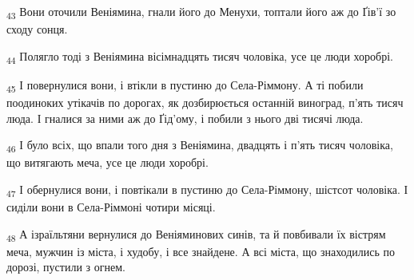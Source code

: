 \begin{tcolorbox}
\textsubscript{43} Вони оточили Веніямина, гнали його до Менухи, топтали його аж до Ґів'ї зо сходу сонця.
\end{tcolorbox}
\begin{tcolorbox}
\textsubscript{44} Полягло тоді з Веніямина вісімнадцять тисяч чоловіка, усе це люди хоробрі.
\end{tcolorbox}
\begin{tcolorbox}
\textsubscript{45} І повернулися вони, і втікли в пустиню до Села-Ріммону. А ті побили поодиноких утікачів по дорогах, як дозбирюється останній виноград, п'ять тисяч люда. І гналися за ними аж до Ґід'ому, і побили з нього дві тисячі люда.
\end{tcolorbox}
\begin{tcolorbox}
\textsubscript{46} І було всіх, що впали того дня з Веніямина, двадцять і п'ять тисяч чоловіка, що витягають меча, усе це люди хоробрі.
\end{tcolorbox}
\begin{tcolorbox}
\textsubscript{47} І обернулися вони, і повтікали в пустиню до Села-Ріммону, шістсот чоловіка. І сиділи вони в Села-Ріммоні чотири місяці.
\end{tcolorbox}
\begin{tcolorbox}
\textsubscript{48} А ізраїльтяни вернулися до Веніяминових синів, та й повбивали їх вістрям меча, мужчин із міста, і худобу, і все знайдене. А всі міста, що знаходились по дорозі, пустили з огнем.
\end{tcolorbox}
